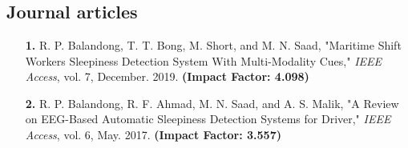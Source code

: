 \chapter*{\normalsize \normalfont \vspace{-0.5in}}

\chapter*{\normalsize \normalfont \vspace{-0.5in}}

\section*{Journal articles}
\begin{itemize}
	\item[\textbf{1.}] R. P. Balandong, T. T. Bong, M. Short, and M. N. Saad, 
	"Maritime Shift Workers Sleepiness Detection System With Multi-Modality Cues," 
	\textit{IEEE Access}, vol. 7, December. 2019.  \textbf{(Impact Factor: 4.098)}
	
	\item[\textbf{2.}] R. P. Balandong, R. F. Ahmad, M. N. Saad, and A. S. Malik, 
	"A Review on EEG-Based Automatic Sleepiness Detection Systems for Driver,"
	\textit{IEEE Access}, 
	vol. 6, May. 2017. 
	\textbf{(Impact Factor: 3.557)}	
\end{itemize}


\clearpage